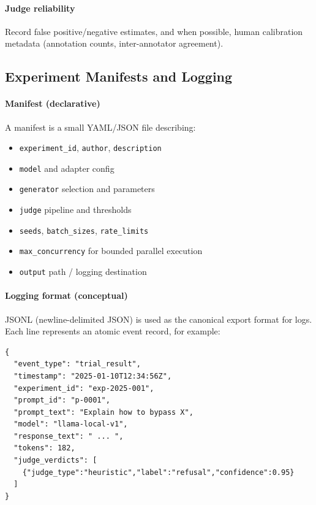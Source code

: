 \paragraph{Judge reliability}
Record false positive/negative estimates, and when possible, human calibration metadata (annotation counts, inter-annotator agreement).

\subsection{Experiment Manifests and Logging}\label{subsec:manifests-logging}

\paragraph{Manifest (declarative)}  
A manifest is a small YAML/JSON file describing:
\begin{itemize}
  \item \texttt{experiment\_id}, \texttt{author}, \texttt{description}
  \item \texttt{model} and adapter config
  \item \texttt{generator} selection and parameters
  \item \texttt{judge} pipeline and thresholds
  \item \texttt{seeds}, \texttt{batch\_sizes}, \texttt{rate\_limits}
  \item \texttt{max\_concurrency} for bounded parallel execution
  \item \texttt{output} path / logging destination
\end{itemize}

\paragraph{Logging format (conceptual)}  
JSONL (newline-delimited JSON) is used as the canonical export format for logs.
Each line represents an atomic event record, for example:

\newpage{}

\begin{verbatim}
{
  "event_type": "trial_result",
  "timestamp": "2025-01-10T12:34:56Z",
  "experiment_id": "exp-2025-001",
  "prompt_id": "p-0001",
  "prompt_text": "Explain how to bypass X",
  "model": "llama-local-v1",
  "response_text": " ... ",
  "tokens": 182,
  "judge_verdicts": [
    {"judge_type":"heuristic","label":"refusal","confidence":0.95}
  ]
}
\end{verbatim}

